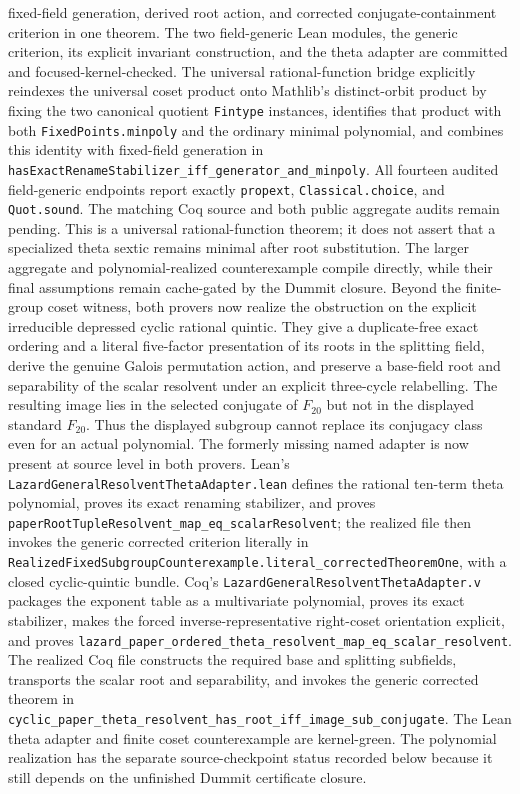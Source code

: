 \documentclass[11pt,a4paper,oneside]{article}
\newcommand{\lean}[1]{\nolinkurl{#1}}
\begin{document}
fixed-field generation, derived root action, and corrected
conjugate-containment criterion in one theorem.  The two field-generic Lean
modules, the generic criterion, its explicit invariant construction, and the
theta adapter are committed and focused-kernel-checked.  The universal
rational-function bridge explicitly reindexes the universal coset product
onto Mathlib's distinct-orbit product by fixing the two canonical quotient
\lean{Fintype} instances, identifies that product with both
\lean{FixedPoints.minpoly} and the ordinary minimal polynomial, and combines
this identity with fixed-field generation in
\lean{hasExactRenameStabilizer_iff_generator_and_minpoly}.  All fourteen
audited field-generic endpoints report exactly \lean{propext},
\lean{Classical.choice}, and
\lean{Quot.sound}.  The matching Coq source and both public aggregate audits
remain pending.  This is a universal rational-function theorem; it does not
assert that a specialized theta sextic remains minimal after root
substitution.  The larger aggregate and polynomial-realized counterexample
compile directly, while their final assumptions remain cache-gated by the
Dummit closure.
Beyond the finite-group coset witness, both
provers now realize the obstruction on the explicit irreducible depressed
cyclic rational quintic.  They give a duplicate-free exact ordering and a
literal five-factor presentation of its roots in the splitting field, derive
the genuine Galois permutation action, and preserve a base-field root and
separability of the scalar resolvent under an explicit three-cycle
relabelling.  The resulting image lies in the selected conjugate of
$F_{20}$ but not in the displayed standard $F_{20}$.  Thus the displayed
subgroup cannot replace its conjugacy class even for an actual polynomial.
The formerly missing named adapter is now present at source level in both
provers.  Lean's
\texttt{LazardGeneralResolventThetaAdapter.lean} defines the rational
ten-term theta polynomial, proves its exact renaming stabilizer, and proves
\lean{paperRootTupleResolvent_map_eq_scalarResolvent}; the realized file
then invokes the generic corrected criterion literally in
\lean{RealizedFixedSubgroupCounterexample.literal_correctedTheoremOne},
with a closed cyclic-quintic bundle.  Coq's
\texttt{LazardGeneralResolventThetaAdapter.v} packages the exponent table as a
multivariate polynomial, proves its exact stabilizer, makes the forced
inverse-representative right-coset orientation explicit, and proves
\lean{lazard_paper_ordered_theta_resolvent_map_eq_scalar_resolvent}.
The realized Coq file constructs the required base and splitting subfields,
transports the scalar root and separability, and invokes the generic corrected
theorem in
\lean{cyclic_paper_theta_resolvent_has_root_iff_image_sub_conjugate}.
The Lean theta adapter and finite coset counterexample are kernel-green.  The
polynomial realization has the separate source-checkpoint status recorded
below because it still depends on the unfinished Dummit certificate closure.
\end{document}
